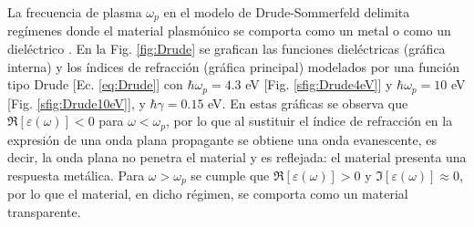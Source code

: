 La frecuencia de plasma $\omega_p$ en el modelo de Drude-Sommerfeld delimita regímenes donde el material plasmónico se comporta como un metal o como un dieléctrico \cite{trugler2011properties}.  En la Fig.  \ref{fig:Drude} se grafican las funciones dieléctricas (gráfica interna) y los índices de refracción  (gráfica principal) modelados por una función tipo Drude [Ec. \eqref{eq:Drude}] con $\hbar\omega_p=4. 3$ eV [Fig.  \ref{sfig:Drude4eV}] y $\hbar\omega_p=10$ eV [Fig.  \ref{sfig:Drude10eV}], y $\hbar\gamma=0. 15$ eV.  En estas gráficas se observa que $\Re[\varepsilon(\omega)]<0$ para $\omega<\omega_p$, por lo que al sustituir el índice de refracción en la expresión de una onda plana propagante se obtiene una onda evanescente, es decir, la onda plana no penetra el material y es reflejada: el material presenta una respuesta metálica.  Para $\omega>\omega_p$ se cumple que $\Re[\varepsilon(\omega)]>0$ y $\Im[\varepsilon(\omega)]\approx 0$, por lo que el material, en dicho régimen, se comporta como un  material transparente. 

